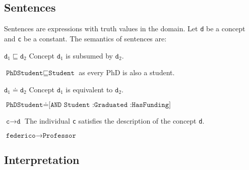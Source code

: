 \subsection{Sentences}
Sentences are expressions with truth values in the domain.
Let \texttt{d} be a concept and \texttt{c} be a constant.
The semantics of sentences are:
\begin{descriptionlist}
    \item[$\texttt{d}_1 \sqsubseteq \texttt{d}_2$]
        Concept $\texttt{d}_1$ is subsumed by $\texttt{d}_2$.
        \begin{example}
            $\texttt{PhDStudent} \sqsubseteq \texttt{Student}$ as every PhD is also a student.
        \end{example}

    \item[$\texttt{d}_1 \doteq \texttt{d}_2$]
        Concept $\texttt{d}_1$ is equivalent to $\texttt{d}_2$.
        \begin{example}
            $\texttt{PhDStudent} \doteq \texttt{[AND Student :Graduated :HasFunding]}$
        \end{example}

    \item[$\texttt{c} \rightarrow \texttt{d}$]
        The individual \texttt{c} satisfies the description of the concept \texttt{d}.
        \begin{example}
            $\texttt{federico} \rightarrow \texttt{Professor}$
        \end{example}
\end{descriptionlist}


\subsection{Interpretation}

